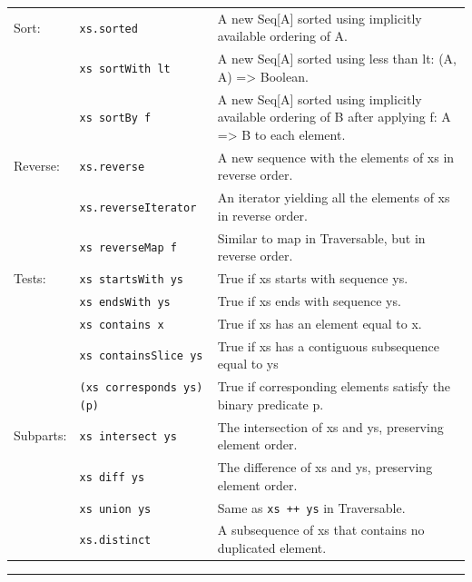\documentclass[article, a5paper]{memoir}
\newcommand{\LangColor}{red}
\newcommand{\head}[1]{{\bfseries {\color{\LangColor}{#1}}\par\vspace{1mm}\hrule\vspace{-2mm}}}
\newcommand{\Newline}{\vspace{\baselineskip}}
\begin{document}
{\begin{tabular}{@{}l p{3.75cm} p{6.8cm}}
  Sort: & \texttt{xs.sorted} & A new Seq[A] sorted using implicitly available ordering of A. \\   \cline{2-3}
   & \texttt{xs sortWith lt} &  	A new Seq[A] sorted using less than lt: (A, A) => Boolean.\\\cline{2-3}
   & \texttt{xs sortBy f} &  	A new Seq[A] sorted using implicitly available ordering of B after applying f: A => B to each element.\\ \cline{1-3}
        

  Reverse: & \texttt{xs.reverse} & A new sequence with the elements of xs in reverse order. \\   \cline{2-3}
   & \texttt{xs.reverseIterator} & An iterator yielding all the elements of xs in reverse order.\\\cline{2-3}
   & \texttt{xs reverseMap f} & Similar to map in Traversable, but in reverse order.\\\cline{1-3}
        

  Tests: & \texttt{xs startsWith ys} & True if xs starts with sequence ys. \\   \cline{2-3}
   & \texttt{xs endsWith ys} & True if xs ends with sequence ys.\\\cline{2-3}
   & \texttt{xs contains x} & True if xs has an element equal to x.\\\cline{2-3}
   & \texttt{xs containsSlice ys} & True if xs has a contiguous subsequence equal to ys\\\cline{2-3}
   & \texttt{(xs corresponds ys)(p)} & True if corresponding elements satisfy the binary predicate p.\\\cline{1-3}
   
  Subparts: & \texttt{xs intersect ys} & The intersection of xs and ys, preserving element order.\\\cline{2-3}
   & \texttt{xs diff ys} & The difference of xs and ys, preserving element order.\\\cline{2-3}
   & \texttt{xs union ys} & Same as \texttt{xs ++ ys} in Traversable.\\\cline{2-3}
   & \texttt{xs.distinct} & A subsequence of xs that contains no duplicated element.\\\cline{1-3}
                   
       
        
\end{tabular}
}  

\head{Methods in trait \texttt{Set[A]}}\Newline
\end{document}
